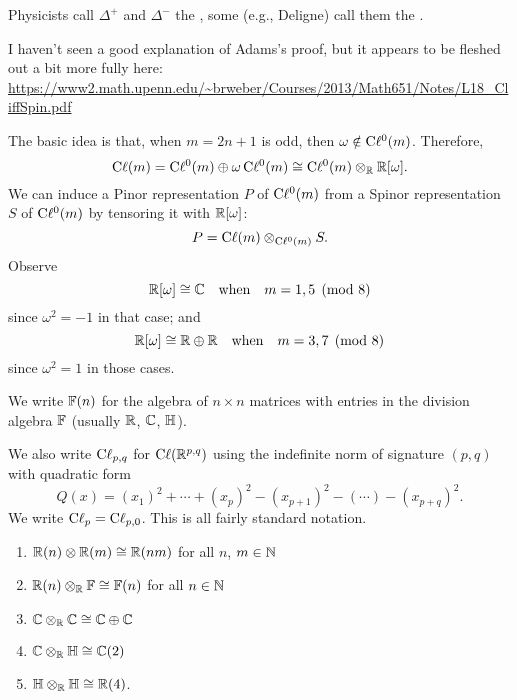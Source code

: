 Physicists call $\Delta^{+}$ and $\Delta^{-}$ the ,
some (e.g., Deligne) call them the .

\begin{remark}
I haven't seen a good explanation of Adams's proof, but it appears to be
fleshed out a bit more fully here: \url{https://www2.math.upenn.edu/~brweber/Courses/2013/Math651/Notes/L18_CliffSpin.pdf}
\end{remark}

\M
The basic idea is that, when $m=2n+1$ is odd, then
$\omega\notin\mathrm{C}\ell^{0}(m)$. Therefore,
\begin{equation}
\mathrm{C}\ell(m) = \mathrm{C}\ell^{0}(m) \oplus \omega\,\mathrm{C}\ell^{0}(m)\cong\mathrm{C}\ell^{0}(m)\otimes_{\mathbb{R}}\mathbb{R}[\omega].
\end{equation}
We can induce a Pinor representation $P$ of $\mathrm{C}\ell^{0}(m)$ from a Spinor
representation $S$ of $\mathrm{C}\ell^{0}(m)$ by tensoring it
with $\mathbb{R}[\omega]$:
\begin{equation}
P = \mathrm{C}\ell(m)\otimes_{\mathrm{C}\ell^{0}(m)} S.
\end{equation}
Observe
\begin{equation}
\mathbb{R}[\omega]\cong\mathbb{C}\quad\mbox{when}\quad m=1,5\pmod8
\end{equation}
since $\omega^{2}=-1$ in that case; and
\begin{equation}
\mathbb{R}[\omega]\cong\mathbb{R}\oplus\mathbb{R}\quad\mbox{when}\quad m=3,7\pmod8
\end{equation}
since $\omega^{2}=1$ in those cases.

We write $\mathbb{F}(n)$ for the algebra of $n\times n$ matrices with entries
in the division algebra $\mathbb{F}$ (usually $\mathbb{R}$, $\mathbb{C}$, $\mathbb{H}$).

We also write $\mathrm{C}\ell_{p,q}$ for $\mathrm{C}\ell(\mathbb{R}^{p,q})$ using the indefinite norm
of signature $(p,q)$ with quadratic form
\begin{equation}
Q(x) = (x_{1})^{2}+\cdots+(x_{p})^{2}-(x_{p+1})^{2}-(\cdots)-(x_{p+q})^{2}.
\end{equation}
We write $\mathrm{C}\ell_{p}=\mathrm{C}\ell_{p,0}$. This is all fairly standard notation.

\begin{proposition}
\begin{enumerate}
\item $\mathbb{R}(n)\otimes\mathbb{R}(m)\cong\mathbb{R}(nm)$ for all $n$, $m\in\mathbb{N}$
\item $\mathbb{R}(n)\otimes_{\mathbb{R}}\mathbb{F}\cong\mathbb{F}(n)$ for all $n\in\mathbb{N}$
\item $\mathbb{C}\otimes_{\mathbb{R}}\mathbb{C}\cong\mathbb{C}\oplus\mathbb{C}$
\item $\mathbb{C}\otimes_{\mathbb{R}}\mathbb{H}\cong\mathbb{C}(2)$
\item $\mathbb{H}\otimes_{\mathbb{R}}\mathbb{H}\cong\mathbb{R}(4)$.
\end{enumerate}
\end{proposition}

